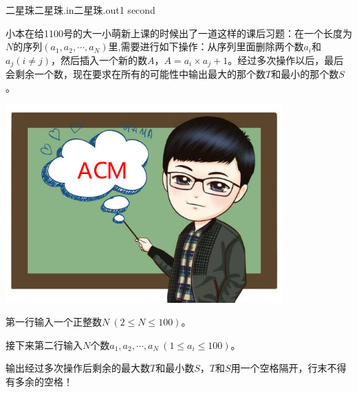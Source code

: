 \begin{problem}{二星珠}{二星珠.in}{二星珠.out}{1 second}

小本在给1100号的大一小萌新上课的时候出了一道这样的课后习题：在一个长度为$N$的序列$(a_1,a_2,\cdots,a_N)$里,需要进行如下操作：从序列里面删除两个数$a_i$和$a_j(i\ne j)$，然后插入一个新的数$A$，$A=a_i\times a_j+1$。经过多次操作以后，最后会剩余一个数，现在要求在所有的可能性中输出最大的那个数$T$和最小的那个数$S$。
\begin{center}
\includegraphics[width=0.8\textwidth]{pics/B.jpg}
\end{center}
\InputFile

第一行输入一个正整数$N\ (2\le N\le 100)$。

接下来第二行输入$N$个数$a_1,a_2,\cdots,a_N\ (1\le a_i\le 100)$。

\OutputFile

输出经过多次操作后剩余的最大数$T$和最小数$S$，$T$和$S$用一个空格隔开，行末不得有多余的空格！

\Examples

\begin{example}
%
\end{example}
\\

\end{problem}
